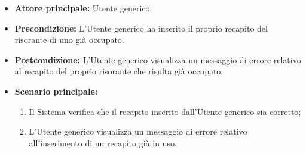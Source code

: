 \label{usecase:Errore registrazione recapito occupato}
\begin{itemize}

	\item \textbf{Attore principale:} Utente generico.

	\item \textbf{Precondizione:} L'Utente generico ha inserito il proprio recapito del risorante di uno già occupato.
	
	\item \textbf{Postcondizione:} L'Utente generico visualizza un messaggio di errore relativo al recapito del proprio risorante che risulta già occupato.

	\item \textbf{Scenario principale:}
	\begin{enumerate}
        \item Il Sistema verifica che il recapito inserito dall'Utente generico sia corretto;
        \item L'Utente generico visualizza un messaggio di errore relativo all'inserimento di un recapito già in uso.
	\end{enumerate}
	
\end{itemize}